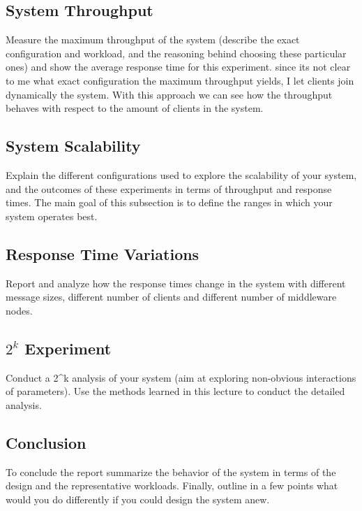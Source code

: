 \documentclass[11pt]{article}
\begin{document}
\subsection{System Throughput}\label{sec:system-throughput}

Measure the maximum throughput of the system (describe the exact
configuration and workload, and the reasoning behind choosing these
particular ones) and show the average response time for this experiment.
\newline
since its not clear to me what exact configuration the maximum throughput yields, I let clients join dynamically the system. With this approach we can see how the throughput behaves with respect to the amount of clients in the system.

\subsection{System Scalability}\label{sec:system-scalability}

Explain the different configurations used to explore the scalability of
your system, and the outcomes of these experiments in terms of
throughput and response times. The main goal of this subsection is to
define the ranges in which your system operates best.

\subsection{Response Time Variations}\label{sec:response-time-variations}

Report and analyze how the response times change in the system with
different message sizes, different number of clients and different
number of middleware nodes.

\subsection{$2^k$ Experiment}\label{sec:k-experiment}

Conduct a 2\^{}k analysis of your system (aim at exploring non-obvious
interactions of parameters). Use the methods learned in this lecture to
conduct the detailed analysis.

\subsection{Conclusion}\label{sec:conclusion}

To conclude the report summarize the behavior of the system in terms of
the design and the representative workloads. Finally, outline in a few
points what would you do differently if you could design the system
anew.
\end{document}
